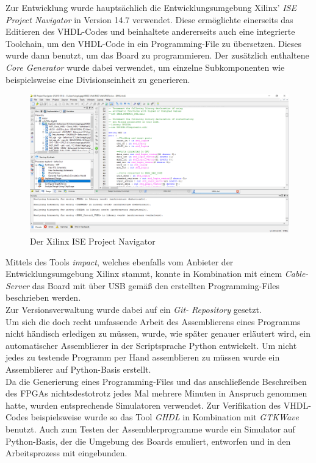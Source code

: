 Zur Entwicklung wurde haupts\"achlich die Entwicklungsumgebung Xilinx' \textit{ISE Project Navigator} in Version 14.7 verwendet. Diese erm\"oglichte einerseits das Editieren des VHDL-Codes und beinhaltete andererseits auch eine integrierte Toolchain, um den VHDL-Code in ein Programming-File zu übersetzen. Dieses wurde dann benutzt, um das Board zu programmieren. Der zus\"atzlich enthaltene \textit{Core Generator} wurde dabei verwendet, um einzelne Subkomponenten wie beispielsweise eine Divisionseinheit zu generieren.\\
\begin{figure}[H]
	\centering
		\includegraphics[width=1.0\textwidth]{ISE.png}
	\caption{Der Xilinx ISE Project Navigator}
	\label{fig:tool}
\end{figure}
Mittels des Tools \textit{impact}, welches ebenfalls vom Anbieter der Entwicklungsumgebung Xilinx stammt, konnte in Kombination mit einem \textit{Cable-Server} das Board mit \"uber USB gem\"a{\ss} den erstellten Programming-Files beschrieben werden.\\
Zur Versionsverwaltung wurde dabei auf ein \textit{Git- Repository} gesetzt.\\ 

Um sich die doch recht umfassende Arbeit des Assemblierens eines Programms nicht h\"andisch erledigen zu m\"ussen, wurde, wie sp\"ater genauer erl\"autert wird, ein automatischer Assemblierer in der Scriptsprache Python entwickelt.
Um nicht jedes zu testende Programm per Hand assemblieren zu m\"ussen wurde ein Assemblierer auf Python-Basis erstellt.\\
Da die Generierung eines Programming-Files und das anschlie{\ss}ende Beschreiben des FPGAs nichtsdestotrotz jedes Mal mehrere Minuten in Anspruch genommen hatte, wurden entsprechende Simulatoren verwendet. Zur Verifikation des VHDL-Codes beispielsweise wurde so das Tool \textit{GHDL} in Kombination mit \textit{GTKWave} benutzt. Auch zum Testen der Assemblerprogramme wurde ein Simulator auf Python-Basis, der die Umgebung des Boards emuliert, entworfen und in den Arbeitsprozess mit eingebunden.

